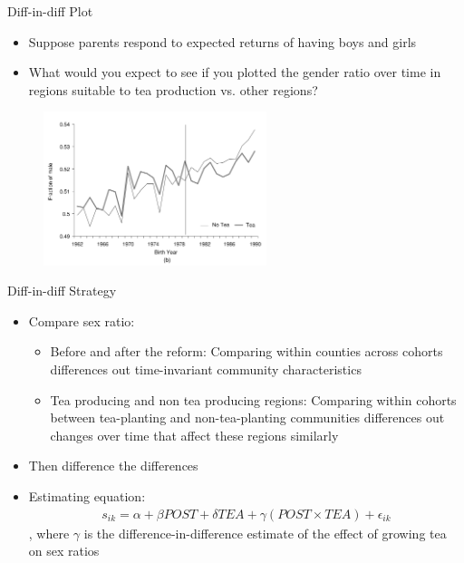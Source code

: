 \documentclass[11pt,notes=hide,aspectratio=169,mathserif]{beamer}
\begin{document}
\begin{frame}{Diff-in-diff Plot}
\begin{itemize}
\item Suppose parents respond to expected returns of having boys and girls
\pause \item What would you expect to see if you plotted the gender ratio over time in regions suitable to tea production vs. other regions?
\end{itemize}
\pause 
\begin{figure}
\centering
\includegraphics[width=0.58\textwidth]{inputs/fig3b.png}
\end{figure}
\end{frame}

\begin{frame}{Diff-in-diff Strategy}
\begin{itemize}
\item Compare sex ratio:
\begin{itemize}
    \pause \item Before and after the reform:  Comparing within counties across cohorts differences out time-invariant community characteristics
    \pause \item Tea producing and non tea producing regions: Comparing within cohorts between tea-planting and non-tea-planting communities differences out changes over time that affect these regions similarly
\end{itemize}
\pause \item Then difference the differences 
\item Estimating equation:
\pause \begin{align*}
s_{ik} = \alpha + \beta POST + \delta TEA + \gamma (POST \times TEA) + \epsilon_{ik}
\end{align*}
, where $\gamma$ is the difference-in-difference estimate of the effect of growing tea on sex ratios
\end{itemize}
\end{frame}
\end{document}

